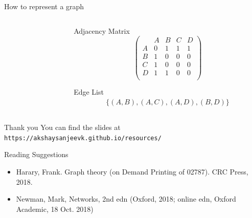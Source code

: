 \documentclass[mathserif]{beamer}
\begin{document}
\begin{frame}{How to represent a graph}
    \begin{columns}

        \begin{column}{0.5\textwidth}
        \end{column}

        \begin{column}{0.5\textwidth}
            \begin{block}{Adjacency Matrix}
            \[
            \begin{pmatrix}
                & A & B & C & D \\
                A & 0 & 1 & 1 & 1 \\
                B & 1 & 0 & 0 & 0 \\
                C & 1 & 0 & 0 & 0 \\
                D & 1 & 1 & 0 & 0 \\
            \end{pmatrix}
            \]
            \end{block}

            \begin{block}{Edge List}
                \begin{align*}
                    \{(A,B),(A,C),
                    (A,D),(B,D)\}
                \end{align*}
            \end{block}
        \end{column}
    \end{columns}
\end{frame}

\begin{frame}{Thank you}
    You can find the slides at \texttt{https://akshaysanjeevk.github.io/resources/}
    \begin{block}{Reading Suggestions}
        \begin{itemize}
        \item Harary, Frank. Graph theory (on Demand Printing of 02787). CRC Press, 2018.
        \item Newman, Mark, Networks, 2nd edn (Oxford, 2018; online edn, Oxford Academic, 18 Oct. 2018)
    \end{itemize}
    \end{block}
    
\end{frame}
\end{document}
